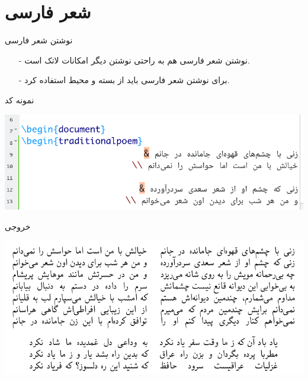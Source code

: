 \section{شعر‌ فارسی}
\begin{frame}{نوشتن شعر فارسی}
\begin{itemize}\itemr
\item[-]
نوشتن شعر فارسی هم به راحتی نوشتن دیگر امکانات لاتک است.

\item[-]
برای نوشتن شعر فارسی باید از بسته 
و محیط 
استفاده کرد.
\end{itemize}
\end{frame}

\begin{frame}[fragile]{نمونه کد}
\begin{center}
\includegraphics[width=\textwidth]{docs/images/tradpoem-code}
\end{center}
\end{frame}

\begin{frame}{خروجی}
\begin{center}
\includegraphics[width=\textwidth]{docs/images/tp-2}
\end{center}
\end{frame}
